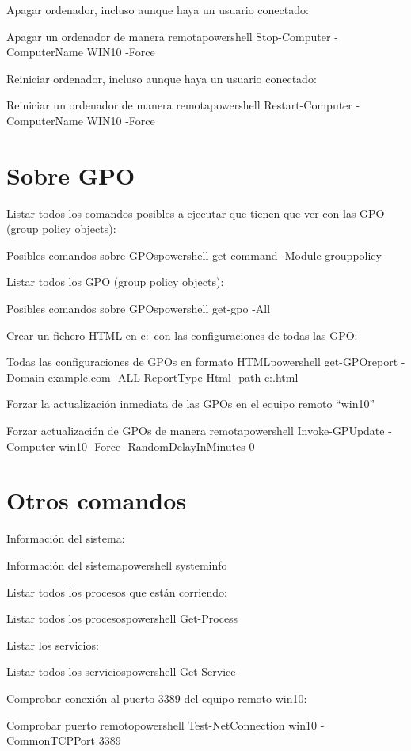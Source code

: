 Apagar ordenador, incluso aunque haya un usuario conectado:
\begin{mycode}{Apagar un ordenador de manera remota}{powershell}{}
Stop-Computer -ComputerName WIN10 -Force
\end{mycode}

Reiniciar ordenador, incluso aunque haya un usuario conectado:
\begin{mycode}{Reiniciar un ordenador de manera remota}{powershell}{}
Restart-Computer -ComputerName WIN10 -Force
\end{mycode}

\section{Sobre GPO}
Listar todos los comandos posibles a ejecutar que tienen que ver con las GPO (group policy objects):
\begin{mycode}{Posibles comandos sobre GPOs}{powershell}{}
get-command -Module grouppolicy
\end{mycode}


Listar todos los GPO (group policy objects):
\begin{mycode}{Posibles comandos sobre GPOs}{powershell}{}
get-gpo -All
\end{mycode}

Crear un fichero HTML en c:\  con las configuraciones de todas las GPO:
\begin{mycode}{Todas las configuraciones de GPOs en formato HTML}{powershell}{}
get-GPOreport -Domain example.com -ALL ReportType Html -path c:\gpo.html
\end{mycode}

Forzar la actualización inmediata de las GPOs en el equipo remoto “win10”
\begin{mycode}{Forzar actualización de GPOs de manera remota}{powershell}{}
Invoke-GPUpdate -Computer win10 -Force -RandomDelayInMinutes 0
\end{mycode}


\section{Otros comandos}
Información del sistema:
\begin{mycode}{Información del sistema}{powershell}{}
systeminfo
\end{mycode}

Listar todos los procesos que están corriendo:
\begin{mycode}{Listar todos los procesos}{powershell}{}
Get-Process
\end{mycode}

Listar los servicios:
\begin{mycode}{Listar todos los servicios}{powershell}{}
Get-Service
\end{mycode}


Comprobar conexión al puerto 3389 del equipo remoto win10:
\begin{mycode}{Comprobar puerto remoto}{powershell}{}
Test-NetConnection win10 -CommonTCPPort 3389
\end{mycode}
